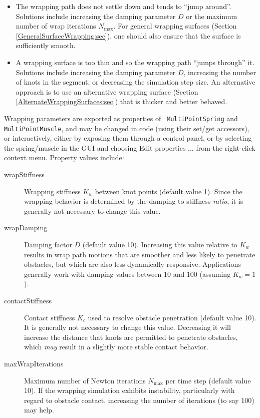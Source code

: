 \begin{itemize}

\item The wrapping path does not settle down and tends to ``jump
around''.  Solutions include increasing the damping parameter $D$ or
the maximum number of wrap iterations $N_\text{max}$. For general wrapping
surfaces (Section \ref{GeneralSurfaceWrapping:sec}), one should also
ensure that the surface is sufficiently smooth.

\item A wrapping surface is too thin and so the wrapping
path ``jumps through'' it. Solutions include increasing the damping
parameter $D$, increasing the number of knots in the segment, or
decreasing the simulation step size. An alternative approach is to use
an alternative wrapping surface
(Section \ref{AlternateWrappingSurfaces:sec}) that is thicker and
better behaved.

\end{itemize}

Wrapping parameters are exported as properties of {\tt
MultiPointSpring} and {\tt MultiPointMuscle}, and may be changed in
code (using their set/get accessors), or interactively,
either by exposing them through a control panel,
or by selecting the spring/muscle in the GUI and choosing {\sf Edit
properties ...} from the right-click context menu.  Property values
include:

\begin{description}

\item[wrapStiffness] Wrapping stiffness $K_w$ between knot points
(default value 1). Since the wrapping behavior is determined by the
damping to stiffness {\it ratio}, it is generally not necessary to
change this value.

\item[wrapDamping] Damping factor $D$ (default
value 10). Increasing this value relative to $K_w$ results in wrap
path motions that are smoother and less likely to penetrate obstacles,
but which are also less dynamically responsive. Applications generally
work with damping values between 10 and 100 (assuming $K_w = 1$).

\item[contactStiffness] Contact stiffness $K_c$ used to resolve obstacle
penetration (default value 10). It is generally not necessary
to change this value. Decreasing it will increase the distance that
knots are permitted to penetrate obstacles, which {\it may} result in
a slightly more stable contact behavior.

\item[maxWrapIterations] Maximum number of Newton iterations
$N_\text{max}$ per time step (default value 10). If the wrapping
simulation exhibits instability, particularly with regard to obstacle
contact, increasing the number of iterations (to say 100) may help.

\end{description}

